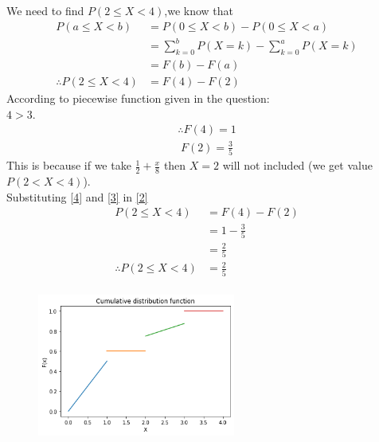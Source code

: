 \documentclass[journal,12pt,twocolumn]{IEEEtran}
\begin{document}
We need to find $P(2 \leq X <4)$,we know that\\
\begin{align}
P(a \leq X <b)&=P(0 \leq X <b)-P(0 \leq X < a)\\
&= \sum_{k=0}^{b}P(X=k) - \sum_{k=0}^{a}P(X=k) \\
&=F(b)-F(a)\\
\therefore P(2 \leq X <4)&=F(4)-F(2) \label{2}
\end{align}
According to piecewise function given in the question:\\
$4>3$.
\begin{align}
\therefore F(4)=1 \label{3}
\end{align}
\begin{align}
F(2)=\frac{3}{5} \label{4}
\end{align}
This is because if we take $\frac{1}{2}+\frac{x}{8}$ then $X=2$ will not included (we get value $P(2 < X <4)$).\\
Substituting \eqref{4} and \eqref{3} in \eqref{2}
\begin{align}
P(2 \leq X <4)&=F(4)-F(2)\\
&=1-\frac{3}{5}\\
&=\frac{2}{5}\\
\therefore P(2 \leq X <4)&=\frac{2}{5}\\
\end{align}



\begin{figure}
\begin{center}
\includegraphics[width=0.58\textwidth]{assignment2.png}
\end{center}
\end{figure}
\end{document}
